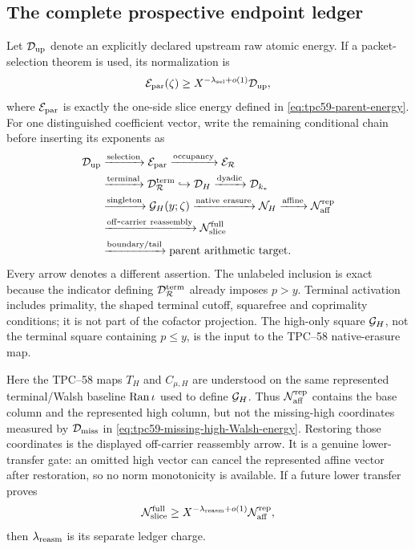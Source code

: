 \subsection{The complete prospective endpoint ledger}

Let \(\mathcal D_{\rm up}\) denote an explicitly declared upstream raw atomic
energy.  If a packet-selection theorem is used, its normalization is
\begin{equation}
 \mathcal E_{\rm par}(\zeta)
 \ge X^{-\lambda_{\rm sel}+o(1)}\mathcal D_{\rm up},
 \label{eq:tpc59-upstream-selection-normalization}
\end{equation}
where \(\mathcal E_{\rm par}\) is exactly the one-side slice energy defined in
\eqref{eq:tpc59-parent-energy}.  For one distinguished coefficient vector,
write the remaining conditional chain before inserting its exponents as
\begin{equation}
 \begin{aligned}
 \mathcal D_{\rm up}
 &\xrightarrow{\rm selection}\mathcal E_{\rm par}
 \xrightarrow{\rm occupancy}\mathcal E_{\mathcal R}\\
 &\xrightarrow{\rm terminal}\mathcal D_{\mathcal R}^{\rm term}
 \hookrightarrow\mathcal D_H
 \xrightarrow{\rm dyadic}\mathcal D_{k_*}\\
 &\xrightarrow{\rm singleton}\mathcal G_H(y;\zeta)
 \xrightarrow{\rm native\ erasure}\mathcal N_H
 \xrightarrow{\rm affine}\mathcal N_{\rm aff}^{\rm rep}\\
 &
 \xrightarrow{\rm off\mbox{-}carrier\ reassembly}
 \mathcal N_{\rm slice}^{\rm full}\\
 &
 \xrightarrow{\rm boundary/tail}\text{parent arithmetic target}.
 \end{aligned}
 \label{eq:tpc59-prospective-transfer-chain}
\end{equation}
Every arrow denotes a different assertion.  The unlabeled inclusion is
exact because the indicator defining \(\mathcal D_{\mathcal R}^{\rm term}\) already
imposes \(p>y\).  Terminal activation includes primality, the shaped
terminal cutoff, squarefree and coprimality conditions; it is not part of
the cofactor projection.  The high-only square \(\mathcal G_H\), not the terminal
square containing \(p\le y\), is the input to the TPC--58 native-erasure
map.

Here the TPC--58 maps \(T_H\) and \(C_{\mu,H}\) are understood on the same
represented terminal/Walsh baseline \(\operatorname{Ran}\iota\) used to define
\(\mathcal G_H\).  Thus \(\mathcal N_{\rm aff}^{\rm rep}\) contains the base
column and the represented high column, but not the missing-high coordinates
measured by \(\mathcal D_{\rm miss}\) in
\eqref{eq:tpc59-missing-high-Walsh-energy}.  Restoring those coordinates is
the displayed off-carrier reassembly arrow.  It is a genuine lower-transfer
gate: an omitted high vector can cancel the represented affine vector after
restoration, so no norm monotonicity is available.
If a future lower transfer proves
\begin{equation}
 \mathcal N_{\rm slice}^{\rm full}
 \ge X^{-\lambda_{\rm reasm}+o(1)}
       \mathcal N_{\rm aff}^{\rm rep},
 \label{eq:tpc59-reassembly-loss-input}
\end{equation}
then \(\lambda_{\rm reasm}\) is its separate ledger charge.


